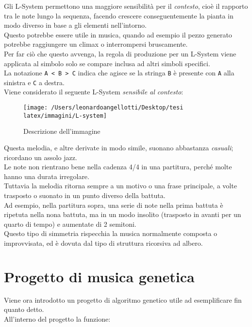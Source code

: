 \documentclass[a4paper,12pt]{report}
\begin{document}
Gli L-System permettono una maggiore sensibilità per il \textit{contesto}, cioè il rapporto tra le note lungo la sequenza, 
facendo crescere conseguentemente la pianta in modo diverso in base a gli elementi nell'intorno. \\
Questo potrebbe essere utile in musica, quando ad esempio il pezzo generato potrebbe raggiungere un climax o interrompersi bruscamente. \\
Per far ciò che questo avvenga, la regola di produzione per un L-System viene applicata al simbolo solo se compare inclusa ad altri simboli specifici. \\
La notazione \texttt{A < B > C} indica che agisce se la stringa \texttt{B} è presente con \texttt{A} alla sinistra e \texttt{C} a destra. \\
Viene considerato il seguente L-System \textit{sensibile al contesto}: 

\begin{figure}[H]
    \centering
    \texttt{[image: /Users/leonardoangellotti/Desktop/tesi latex/immagini/L-system]} 
    \caption{Descrizione dell'immagine}
    \label{fig:immagine8}
\end{figure}

Questa melodia, e altre derivate in modo simile, suonano abbastanza \textit{casuali}; ricordano un assolo jazz. \\
Le note non rientrano bene nella cadenza 4/4 in una partitura, perché molte hanno una durata irregolare. \\
Tuttavia la melodia ritorna sempre a un motivo o una frase principale, a volte trasposto o suonato in un punto diverso della battuta. \\
Ad esempio, nella partitura sopra, una serie di note nella prima battuta è ripetuta nella nona battuta, ma in un modo insolito (trasposto in avanti per un quarto di tempo) e aumentate di 2 semitoni. \\
Questo tipo di simmetria rispecchia la musica normalmente composta o improvvisata, ed è dovuta dal tipo di struttura ricorsiva ad albero. 

\chapter{Progetto di musica genetica}

Viene ora introdotto un progetto di algoritmo genetico utile ad esemplificare fin quanto detto. \\
All'interno del progetto la funzione:
\end{document}
